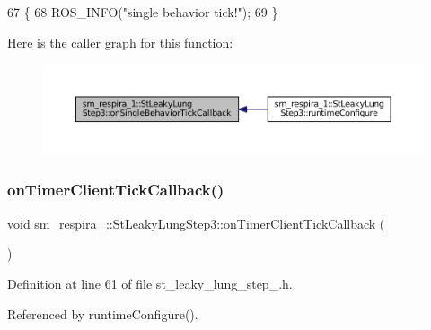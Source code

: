 \begin{DoxyCode}
67     \{
68         ROS\_INFO(\textcolor{stringliteral}{"single behavior tick!"});
69     \}
\end{DoxyCode}
Here is the caller graph for this function\+:
\nopagebreak
\begin{figure}[H]
\begin{center}
\leavevmode
\includegraphics[width=350pt]{structsm__respira__1_1_1StLeakyLungStep3_a2d8634bd1a528c486d8d5f4454bbfef5_icgraph}
\end{center}
\end{figure}
\mbox{\label{structsm__respira__1_1_1StLeakyLungStep3_aba1b3c5760856cfc92389b526650a189}} 
\subsubsection{\texorpdfstring{on\+Timer\+Client\+Tick\+Callback()}{onTimerClientTickCallback()}}
{\footnotesize\ttfamily void sm\+\_\+respira\+\_\+::\+St\+Leaky\+Lung\+Step3\+::on\+Timer\+Client\+Tick\+Callback (\begin{DoxyParamCaption}{ }\end{DoxyParamCaption})\hspace{0.3cm}{\ttfamily [inline]}}



Definition at line 61 of file st\+\_\+leaky\+\_\+lung\+\_\+step\+\_.\+h.



Referenced by runtime\+Configure().


